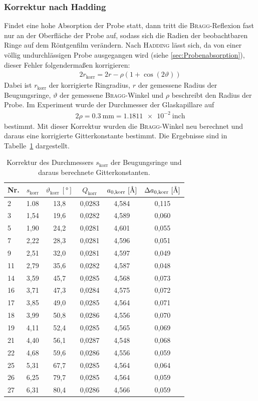 \documentclass[a4paper,twoside,final]{article}
\begin{document}
\subsubsection{Korrektur nach Hadding}
Findet eine hohe Absorption der Probe statt, dann tritt die \textsc{Bragg}-Reflexion fast nur an der Oberfläche der Probe auf, sodass sich die Radien der beobachtbaren Ringe auf dem Röntgenfilm verändern. Nach \textsc{Hadding} lässt sich, da von einer völlig undurchlässigen Probe ausgegangen wird (siehe \ref{sec:Probenabsorption}), dieser Fehler folgendermaßen korrigieren:
\begin{align}
  2r_\text{korr} = 2r - \rho (1+\cos(2\vartheta))
\end{align}
Dabei ist $r_\text{korr}$ der korrigierte Ringradius, $r$ der gemessene Radius der Beugungsringe, $\vartheta$ der gemessene \textsc{Bragg}-Winkel und $\rho$ beschreibt den Radius der Probe. Im Experiment wurde der Durchmesser der Glaskapillare auf
\begin{align}
  2\rho = \SI{0,3}{\milli\metre} = \SI{1,1811e-2}{\text{inch}}
\end{align}
bestimmt. Mit dieser Korrektur wurden die \textsc{Bragg}-Winkel neu berechnet und daraus eine korrigierte Gitterkonstante bestimmt. Die Ergebnisse sind in Tabelle~\ref{tab:Hadding} dargestellt.
\begin{table}[ht]
	\centering
	\caption{Korrektur des Durchmessers $s_\text{korr}$ der Beugungsringe und daraus berechnete Gitterkonstanten.}
	\label{tab:Hadding}
	\begin{tabular}{l c c c c c}
		\toprule
      Nr. & $s_\text{korr}$ & $\vartheta_\text{korr}~[\si{\degree}]$ & $Q_\text{korr}$ & $a_{0,\text{korr}}~[\si{\textup{\AA}}]$ & $\Delta a_{0,\text{korr}}~[\si{\textup{\AA}}]$\\
    \midrule
    2  & 1.08 & 13,8 & 0,0283 & 4,584 & 0,115 \\
    3  & 1,54 & 19,6 & 0,0282 & 4,589 & 0,060 \\
    5  & 1,90 & 24,2 & 0,0281 & 4,601 & 0,055 \\
    7  & 2,22 & 28,3 & 0,0281 & 4,596 & 0,051 \\
    9  & 2,51 & 32,0 & 0,0281 & 4,597 & 0,049 \\
    11 & 2,79 & 35,6 & 0,0282 & 4,587 & 0,048 \\
    14 & 3,59 & 45,7 & 0,0285 & 4,568 & 0,073 \\
    16 & 3,71 & 47,3 & 0,0284 & 4,575 & 0,072 \\
    17 & 3,85 & 49,0 & 0,0285 & 4,564 & 0,071 \\
    18 & 3,99 & 50,8 & 0,0286 & 4,556 & 0,070 \\
    19 & 4,11 & 52,4 & 0,0285 & 4,565 & 0,069 \\
    21 & 4,40 & 56,1 & 0,0287 & 4,548 & 0,068 \\
    22 & 4,68 & 59,6 & 0,0286 & 4,556 & 0,059 \\
    25 & 5,31 & 67,7 & 0,0285 & 4,564 & 0,064 \\
    26 & 6,25 & 79,7 & 0,0285 & 4,564 & 0,059 \\
    27 & 6,31 & 80,4 & 0,0286 & 4,566 & 0,059
	\end{tabular}
\end{table}
\end{document}
